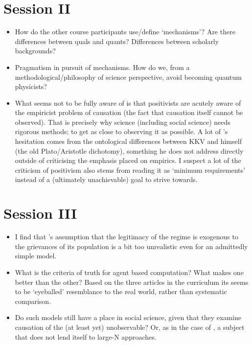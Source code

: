 \documentclass[12pt]{article}
\begin{document}
\section*{Session II}

\begin{itemize}

	\item How do the other course participants use/define `mechanisms'? Are
		there differences between quals and quants? Differences between
		scholarly backgrounds?

	\item Pragmatism in pursuit of mechanisms. How do we, from a
		methodological/philosophy of science perspective, avoid becoming
		quantum physicists?  

	\item What \citet{Johnson_2006} seems not to be fully aware of is that
		positivists are acutely aware of the empiricist problem of
		causation (the fact that causation itself cannot be observed).
		That is precisely why science (including social science) needs
		rigorous methods; to get as close to observing it as possible.
		A lot of \citet{Johnson_2006}'s hesitation comes from the
		ontological differences between KKV and himself (the old
		Plato/Aristotle dichotomy), something he does not address
		directly outside of criticising the emphasis placed on empirics.
		I suspect a lot of the criticism of positivism also stems from
		reading it as `minimum requirements' instead of a (ultimately
		unachievable) goal to strive towards.

\end{itemize}

\section*{Session III}

\begin{itemize}

	\item I find that \citet{Epstein_2002}'s assumption that the legitimacy
		of the regime is exogenous to the grievances of its population
		is a bit too unrealistic even for an admittedly simple model.

	\item What is the criteria of truth for agent based computation? What
		makes one better than the other? Based on the three articles in
		the curriculum its seems to be `eyeballed' resemblance to the
		real world, rather than systematic comparison.

	\item Do such models still have a place in social science, given that
		they examine causation of the (at least yet) unobservable? Or,
		as in the case of \citet{Bhavnani_2008}, a subject that does not
		lend itself to large-N approaches.

\end{itemize}
\end{document}
